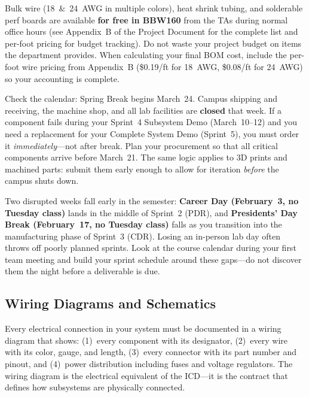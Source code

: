 \documentclass[11pt,letterpaper,twoside,openany]{book}
\begin{document}
\begin{tipbox}
Bulk wire (18~\&~24~AWG in multiple colors), heat shrink tubing, and solderable perf boards are available \textbf{for free in BBW160} from the TAs during normal office hours (see Appendix~B of the Project Document for the complete list and per-foot pricing for budget tracking). Do not waste your project budget on items the department provides. When calculating your final BOM cost, include the per-foot wire pricing from Appendix~B (\$0.19/ft for 18~AWG, \$0.08/ft for 24~AWG) so your accounting is complete.
\end{tipbox}

\begin{warningbox}
Check the calendar: Spring Break begins March~24. Campus shipping and receiving, the machine shop, and all lab facilities are \textbf{closed} that week. If a component fails during your Sprint~4 Subsystem Demo (March~10--12) and you need a replacement for your Complete System Demo (Sprint~5), you must order it \emph{immediately}---not after break. Plan your procurement so that all critical components arrive before March~21. The same logic applies to 3D prints and machined parts: submit them early enough to allow for iteration \emph{before} the campus shuts down.
\end{warningbox}

\begin{warningbox}
Two disrupted weeks fall early in the semester: \textbf{Career Day (February~3, no Tuesday class)} lands in the middle of Sprint~2 (PDR), and \textbf{Presidents' Day Break (February~17, no Tuesday class)} falls as you transition into the manufacturing phase of Sprint~3 (CDR). Losing an in-person lab day often throws off poorly planned sprints. Look at the course calendar during your first team meeting and build your sprint schedule around these gaps---do not discover them the night before a deliverable is due.
\end{warningbox}

\subsection{Wiring Diagrams and Schematics}
Every electrical connection in your system must be documented in a wiring diagram that shows: (1)~every component with its designator, (2)~every wire with its color, gauge, and length, (3)~every connector with its part number and pinout, and (4)~power distribution including fuses and voltage regulators. The wiring diagram is the electrical equivalent of the ICD---it is the contract that defines how subsystems are physically connected.
\end{document}
